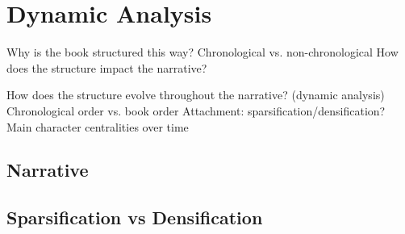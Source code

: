 \section{Dynamic Analysis}

Why is the book structured this way?
Chronological vs. non-chronological
How does the structure impact the narrative?

How does the structure evolve throughout the narrative? (dynamic analysis)
Chronological order vs. book order
Attachment: sparsification/densification?
Main character centralities over time

\subsection{Narrative}

\subsection{Sparsification vs Densification}
